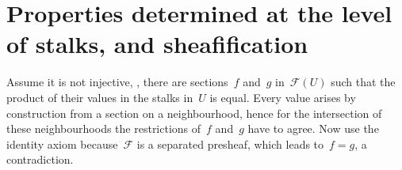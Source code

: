 \section{Properties determined at the level of stalks, and sheafification}

\begin{exercise}
  Assume it is not injective, \ie, there are sections~$f$ and~$g$ in~$\mathcal{F}(U)$ such that the product of their values in the stalks in~$U$ is equal. Every value arises by construction from a section on a neighbourhood, hence for the intersection of these neighbourhoods the restrictions of~$f$ and~$g$ have to agree. Now use the identity axiom because~$\mathcal{F}$ is a separated presheaf, which leads to~$f=g$, a contradiction.
\end{exercise}
